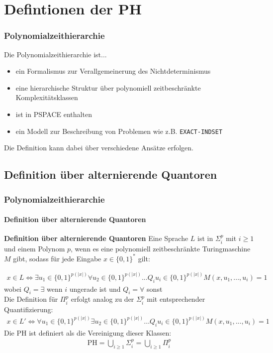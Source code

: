 \section{Defintionen der PH}
\begin{frame}
    \frametitle{Polynomialzeithierarchie}
    Die Polynomialzeithierarchie ist... 
    \begin{itemize}
        \item ein Formalismus zur Verallgemeinerung des Nichtdeterminismus
        \item eine hierarchische Struktur über polynomiell zeitbeschränkte Komplexitätsklassen
        \item ist in PSPACE enthalten
        \item ein Modell zur Beschreibung von Problemen wie z.B. \texttt{EXACT-INDSET}
    \end{itemize}
    Die Definition kann dabei über verschiedene Ansätze erfolgen.
\end{frame}

\subsection{Definition über alternierende Quantoren}
\begin{frame}
    \frametitle{Polynomialzeithierarchie}
    \framesubtitle{Definition über alternierende Quantoren}
    \begin{block}{\textbf{Definition über alternierende Quantoren}}
        Eine Sprache $L$ ist in $\Sigma^p_i$ mit $i \geq 1$ und einem Polynom $p$, wenn es eine polynomiell zeitbeschränkte Turingmaschine $M$ gibt, sodass für jede Eingabe $x \in \{0, 1\}^*$ gilt:

        \small
        \begin{align*}
            x \in L \Leftrightarrow \exists u_1 \in \{0,1\}^{p(|x|)} \forall u_2 \in \{0,1\}^{p(|x|)} ... Q_i u_i \in \{0,1\}^{p(|x|)} M(x, u_1, ..., u_i) = 1
        \end{align*}
        wobei $Q_i = \exists$ wenn $i$ ungerade ist und $Q_i = \forall $ sonst \\
       Die Definition für $\Pi^p_i$ erfolgt analog zu der $\Sigma_i^p$ mit entsprechender Quantifizierung:
        \small
        \begin{align*}
            x \in L' \Leftrightarrow \forall u_1 \in \{0,1\}^{p(|x|)} \exists u_2 \in \{0,1\}^{p(|x|)} ... Q_i u_i \in \{0,1\}^{p(|x|)} M(x, u_1, ..., u_i) = 1
        \end{align*}
        Die PH ist definiert als die Vereinigung dieser Klassen:
        \begin{align*}
            \text{PH} = \bigcup_{i \geq 1} \Sigma^p_i = \bigcup_{i \geq 1} \Pi^p_i 
        \end{align*}
    \end{block}
\end{frame}

